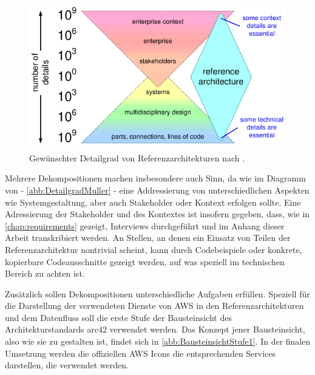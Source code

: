 \begin{figure}[H]
\centering
\includegraphics[height=0.23\textheight]{graphics/reference-architecture-details.pdf}
\caption[Gewünschter Detailgrad von Referenzarchitekturen nach \citeauthor{Muller.2020}]{Gewünschter Detailgrad von Referenzarchitekturen nach \citeauthor{Muller.2020}.\footnotemark}
\label{abb:DetailgradMuller}
\end{figure}

Mehrere Dekompositionen machen insbesondere auch Sinn, da wie im Diagramm von \citeauthor{Muller.2020} - \autoref{abb:DetailgradMuller} - eine Addressierung von unterschiedlichen Aspekten wie Systemgestaltung, aber auch Stakeholder oder Kontext erfolgen sollte. Eine Adressierung der Stakeholder und des Kontextes ist insofern gegeben, dass, wie in \autoref{chap:requirements} gezeigt, Interviews durchgeführt und im Anhang dieser Arbeit transkribiert werden. An Stellen, an denen ein Einsatz von Teilen der Referenzarchitektur nontrivial scheint, kann durch Codebeispiele oder konkrete, kopierbare Codeausschnitte gezeigt werden, auf was speziell im technischen Bereich zu achten ist.

Zusätzlich sollen Dekompositionen unterschiedliche Aufgaben erfüllen. Speziell für die Darstellung der verwendeten Dienste von \ac{AWS} in den Referenzarchitekturen und dem Datenfluss soll die erste Stufe der Bausteinsicht des Architekturstandards arc42 verwendet werden. Das Konzept jener Bausteinsicht, also wie sie zu gestalten ist, findet sich in \autoref{abb:BausteinsichtStufe1}. In der finalen Umsetzung werden die offiziellen \ac{AWS} Icons die entsprechenden Services darstellen, die verwendet werden.

